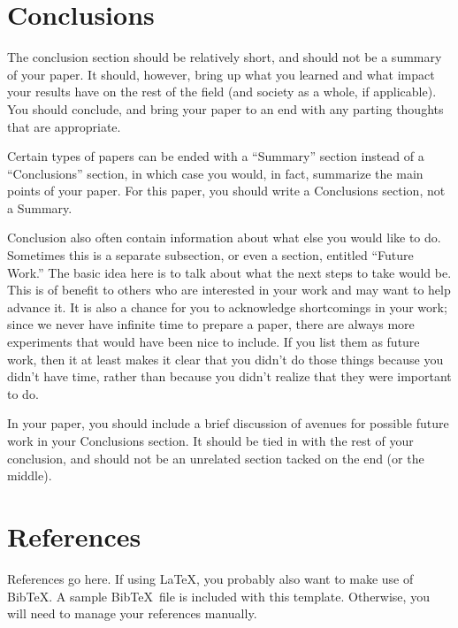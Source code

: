 \documentclass[12pt,letterpaper]{article}
\begin{document}
\section{Conclusions}
The conclusion section should be relatively short, and should not be a summary
of your paper.  It should, however, bring up what you learned and what impact
your results have on the rest of the field (and society as a
whole, if applicable).  You should conclude, and bring your paper to an  end
with any parting thoughts that are appropriate.

Certain types of papers can be ended with a ``Summary'' section instead of a
``Conclusions'' section, in which case you would, in fact, summarize the main
points of your paper.  For this paper, you should write a Conclusions section,
not a Summary.

Conclusion also often contain information about what else you would like
to do.  Sometimes this is a separate subsection, or even a section, entitled
``Future Work.''  The basic idea here is to talk about what the next steps to
take would be.  This is of benefit to others who are interested in your
work and may want to help advance it.  It is also a chance for you to
acknowledge shortcomings in your work; since we never have infinite time to
prepare a paper, there are always more experiments that would have been nice to
include.  If you list them as future work, then it at least makes it clear that
you didn't do those things because you didn't have time, rather than because you
didn't realize that they were important to do.

In your paper, you should include a brief discussion of avenues for possible
future work in your Conclusions section.  It should be tied in with the rest of
your conclusion, and should not be an unrelated section tacked on the end (or
the middle).

\section*{References}
References go here. If using \LaTeX, you probably also want to make use of {\sc Bib}\TeX. 
A sample {\sc Bib}\TeX\  file is included with this template. 
Otherwise, you will need to manage your references manually.



\end{document}
